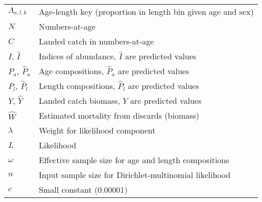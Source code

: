 \documentclass[
]{article}
\begin{document}
\begin{longtable}[t]{ll}
\hspace{1em}$\Lambda_{a,l,k}$ & Age-length key (proportion in length bin given age and sex)\\
\hspace{1em}$N$ & Numbers-at-age\\
\hspace{1em}$C$ & Landed catch in numbers-at-age\\
\hspace{1em}$I$, $\hat{I}$ & Indices of abundance, $\hat{I}$ are predicted values\\
\hspace{1em}$P_a$, $\hat{P}_a$ & Age compositions, $\hat{P}_a$ are predicted values\\
\hspace{1em}$P_l$, $\hat{P}_l$ & Length compositions, $\hat{P}_l$ are predicted values\\
\hspace{1em}$Y$, $\hat{Y}$ & Landed catch biomass, $\hat{Y}$ are predicted values\\
\hspace{1em}$\hat{W}$ & Estimated mortality from discards (biomass)\\
\hspace{1em}$\lambda$ & Weight for likelihood component\\
\hspace{1em}$L$ & Likelihood\\
\hspace{1em}$\omega$ & Effective sample size for age and length compositions\\
\hspace{1em}$n$ & Input sample size for Dirichlet-multinomial likelihood\\
\hspace{1em}$c$ & Small constant (0.00001)\\
\bottomrule
\end{longtable}
\end{document}
